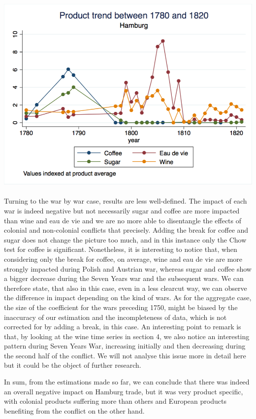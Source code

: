 \documentclass[12pt,a4paper,titlepage,english]{article}
\begin{document}
\includegraphics[scale=.35]{hamburg_product_1820.png}\\~\\
Turning to the war by war case, results are less well-defined. The impact of each war is indeed negative but not necessarily sugar and coffee are more impacted than wine and eau de vie and we are no more able to disentangle the effects of colonial and non-colonial conflicts that precisely. Adding the break for coffee and sugar does not change the picture too much, and in this instance only the Chow test for coffee is significant. Nonetheless, it is interesting to notice that, when considering only the break for coffee, on average, wine and eau de vie are more strongly impacted during Polish and Austrian war, whereas sugar and coffee show a bigger decrease during the Seven Years war and the subsequent wars. We can therefore state, that also in this case, even in a less clearcut way, we can observe the difference in impact depending on the kind of wars. As for the aggregate case, the size of the coefficient for the wars preceding 1750, might be biased by the inaccuracy of our estimation and the incompleteness of data, which is not corrected for by adding a break, in this case. 
An interesting point to remark is that, by looking at the wine time series in section 4, we also notice an interesting pattern during Seven Years War, increasing initially and then decreasing during the second half of the conflict.  We will not analyse this issue more in detail here but it could be the object of further research. 


In sum, from the estimations made so far, we can conclude that there was indeed an overall negative impact on Hamburg trade, but it was very product specific, with colonial products suffering more than others and European products benefiting from the conflict on the other hand.
\end{document}
